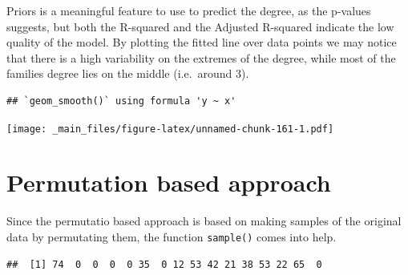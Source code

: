 \documentclass[
  notitlepage,
  onecolumn,
  openany]{book}
\newenvironment{Shaded}{\begin{snugshade}}{\end{snugshade}}
\newcommand{\AttributeTok}[1]{\textcolor[rgb]{0.77,0.63,0.00}{#1}}
\newcommand{\CommentTok}[1]{\textcolor[rgb]{0.56,0.35,0.01}{\textit{#1}}}
\newcommand{\DocumentationTok}[1]{\textcolor[rgb]{0.56,0.35,0.01}{\textbf{\textit{#1}}}}
\newcommand{\FunctionTok}[1]{\textcolor[rgb]{0.00,0.00,0.00}{#1}}
\newcommand{\NormalTok}[1]{#1}
\newcommand{\OtherTok}[1]{\textcolor[rgb]{0.56,0.35,0.01}{#1}}
\newcommand{\SpecialCharTok}[1]{\textcolor[rgb]{0.00,0.00,0.00}{#1}}
\begin{document}
Priors is a meaningful feature to use to predict the degree, as the p-values suggests, but both the R-squared and the Adjusted R-squared indicate the low quality of the model. By plotting the fitted line over data points we may notice that there is a high variability on the extremes of the degree, while most of the families degree lies on the middle (i.e.~around 3).

\begin{Shaded}
\end{Shaded}

\begin{verbatim}
## `geom_smooth()` using formula 'y ~ x'
\end{verbatim}

\texttt{[image: \_main\_files/figure-latex/unnamed-chunk-161-1.pdf]}

\hypertarget{permutation-based-approach-1}{%
\section{Permutation based approach}\label{permutation-based-approach-1}}

Since the permutatio based approach is based on making samples of the original data by permutating them, the function \texttt{sample()} comes into help.

\begin{Shaded}
\end{Shaded}

\begin{verbatim}
##  [1] 74  0  0  0  0 35  0 12 53 42 21 38 53 22 65  0
\end{verbatim}
\end{document}
